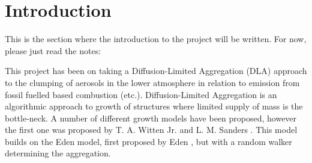 \section{Introduction}

This is the section where the introduction to the project will be written. For now, please just read the notes: 

This project has been on taking a Diffusion-Limited Aggregation (DLA) approach to the clumping of aerosols in the lower atmosphere in relation to emission from fossil fuelled based combustion (etc.). Diffusion-Limited Aggregation is an algorithmic approach to growth of structures where limited supply of mass is the bottle-neck. A number of different growth models have been proposed, however the first one was proposed by T. A. Witten Jr. and L. M. Sanders \cite{PhysRevLett.47.1400}. This model builds on the Eden model, first proposed by Eden \cite{eden1961}, but with a random walker determining the aggregation.  
